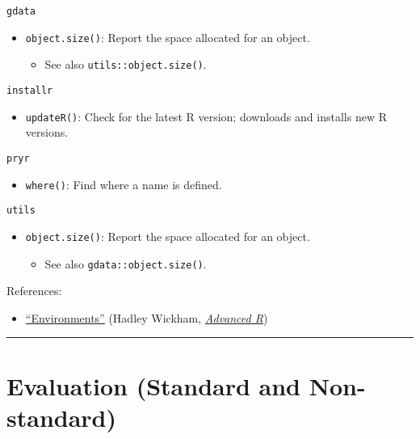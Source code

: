 \documentclass[]{book}
\providecommand{\tightlist}{%
  \setlength{\itemsep}{0pt}\setlength{\parskip}{0pt}}
\theoremstyle{definition}
\theoremstyle{definition}
\theoremstyle{definition}
\theoremstyle{remark}
\begin{document}
\texttt{gdata}

\begin{itemize}
\tightlist
\item
  \texttt{object.size()}: Report the space allocated for an object.

  \begin{itemize}
  \tightlist
  \item
    See also \texttt{utils::object.size()}.
  \end{itemize}
\end{itemize}

\texttt{installr}

\begin{itemize}
\tightlist
\item
  \texttt{updateR()}: Check for the latest R version; downloads and
  installs new R versions.
\end{itemize}

\texttt{pryr}

\begin{itemize}
\tightlist
\item
  \texttt{where()}: Find where a name is defined.
\end{itemize}

\texttt{utils}

\begin{itemize}
\tightlist
\item
  \texttt{object.size()}: Report the space allocated for an object.

  \begin{itemize}
  \tightlist
  \item
    See also \texttt{gdata::object.size()}.
  \end{itemize}
\end{itemize}

References:

\begin{itemize}
\tightlist
\item
  \href{http://adv-r.had.co.nz/Environments.html\#environments}{``Environments''}
  (Hadley Wickham, \href{http://adv-r.had.co.nz/}{\emph{Advanced R}})
\end{itemize}

\begin{center}\rule{0.5\linewidth}{\linethickness}\end{center}

\section{Evaluation (Standard and
Non-standard)}\label{evaluation-standard-and-non-standard}
\end{document}
